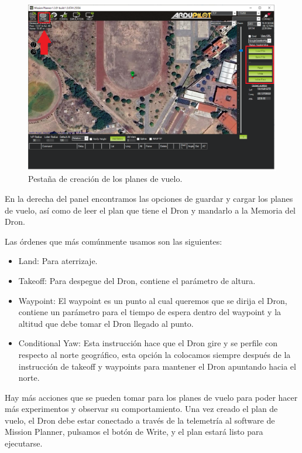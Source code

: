 \begin{figure}[h]
	\centering
	\includegraphics[width=\linewidth]{imagenes/pv1}
	\caption{Pestaña de creación de los planes de vuelo.}
	\label{fig:pv1}
\end{figure}

En la derecha del panel encontramos las opciones de guardar y cargar los planes de vuelo, así como de leer el plan que tiene el Dron y mandarlo a la Memoria del Dron.

Las órdenes que más comúnmente usamos son las siguientes:

\begin{itemize}
	\item Land: Para aterrizaje.
	\item Takeoff: Para despegue del Dron, contiene el parámetro de altura.
	\item Waypoint: El waypoint es un punto al cual queremos que se dirija el Dron, contiene un parámetro para el tiempo de espera dentro del waypoint y la altitud que debe tomar el Dron llegado al punto.
	\item Conditional Yaw: Esta instrucción hace que el Dron gire y se perfile con respecto al norte geográfico, esta opción la colocamos siempre después de la instrucción de takeoff y waypoints para mantener el Dron apuntando hacia el norte.
	
\end{itemize}

Hay más acciones que se pueden tomar para los planes de vuelo para poder hacer más experimentos y observar su comportamiento. Una vez creado el plan de vuelo, el Dron debe estar conectado a través de la telemetría al software de Mission Planner, pulsamos el botón de Write, y el plan estará listo para ejecutarse.

